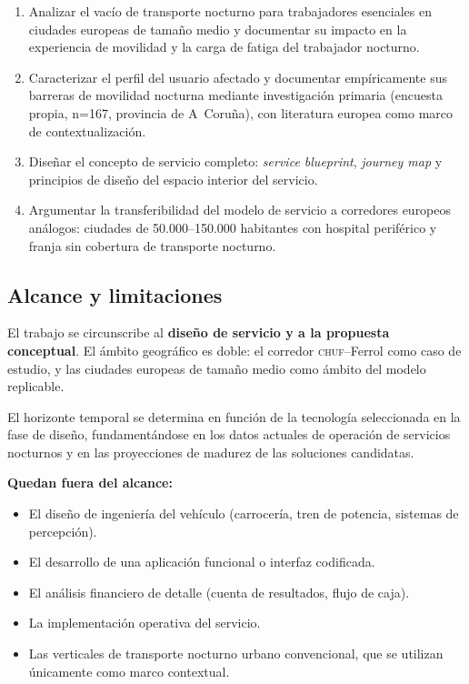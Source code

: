 \begin{enumerate}[label=\arabic*., leftmargin=*, noitemsep]
  \item Analizar el vacío de transporte nocturno para trabajadores esenciales
        en ciudades europeas de tamaño medio y documentar su impacto en la
        experiencia de movilidad y la carga de fatiga del trabajador nocturno.
  \item Caracterizar el perfil del usuario afectado y documentar empíricamente
        sus barreras de movilidad nocturna mediante investigación primaria
        (encuesta propia, n=167, provincia de A~Coruña), con literatura
        europea como marco de contextualización.
  \item Diseñar el concepto de servicio completo: \textit{service blueprint},
        \textit{journey map} y principios de diseño del espacio interior del
        servicio.
  \item Argumentar la transferibilidad del modelo de servicio a corredores
        europeos análogos: ciudades de 50.000--150.000 habitantes con
        hospital periférico y franja sin cobertura de transporte nocturno.
\end{enumerate}



\subsection{Alcance y limitaciones}
\label{sec:alcance}

El trabajo se circunscribe al \textbf{diseño de servicio y a la propuesta
conceptual}. El ámbito geográfico es doble: el corredor \textsc{chuf}--Ferrol
como caso de estudio, y las ciudades europeas de tamaño medio como ámbito
del modelo replicable.

El horizonte temporal se determina en función de la tecnología seleccionada en la fase de diseño, fundamentándose en los datos actuales de operación de servicios nocturnos y en las proyecciones de madurez de las soluciones candidatas.

\textbf{Quedan fuera del alcance:}
\begin{itemize}
  \item El diseño de ingeniería del vehículo (carrocería, tren de potencia,
        sistemas de percepción).
  \item El desarrollo de una aplicación funcional o interfaz codificada.
  \item El análisis financiero de detalle (cuenta de resultados, flujo
        de caja).
  \item La implementación operativa del servicio.
  \item Las verticales de transporte nocturno urbano convencional, que se utilizan únicamente como marco
        contextual.
\end{itemize}

